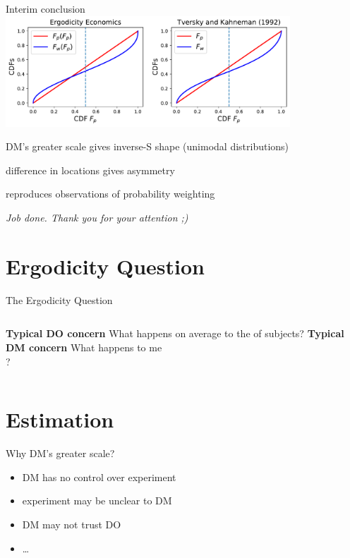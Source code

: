 \begin{frame}{Interim conclusion}
\label{InterimConclusion}
\centering \includegraphics[width=0.8\textwidth]{../../figs/Our_result_LocScale_vs_KT.pdf}

\bi
	\item DM's greater scale gives inverse-S shape (unimodal distributions)
	\item difference in locations gives asymmetry
	\item reproduces observations of probability weighting
	\item[]
	\item[] \textit{Job done. Thank you for your attention ;)}
\ei
\end{frame}

\section{Ergodicity Question}

\begin{frame}{The Ergodicity Question}
\begin{columns}[T]
	\bc \textbf{Typical DO concern} \ec
	What happens on average to the  of subjects?
\centering \vspace{4em}  \red{\large $\neq$}
	\bc \textbf{Typical DM concern} \ec
	What happens to me \\
	?
\end{columns}
\end{frame}


\section{Estimation}

\begin{frame}{Why DM's greater scale?}
\begin{itemize}
  \item DM has no control over experiment
  \item experiment may be unclear to DM
  \item DM may not trust DO
  \item \ldots
\end{itemize}
\end{frame}

